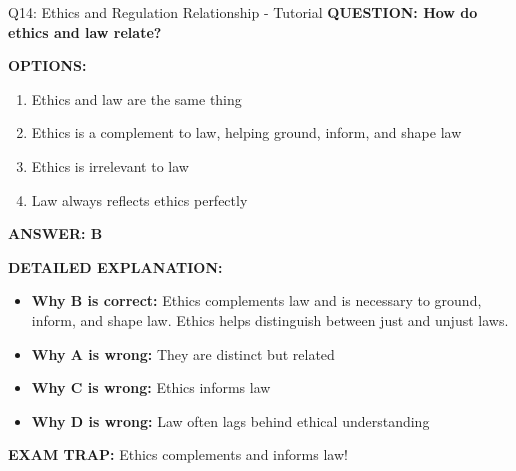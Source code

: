 \documentclass[8pt]{beamer}
\begin{document}
	\begin{frame}{Q14: Ethics and Regulation Relationship - Tutorial}
		\fontsize{6.5}{7.5}\selectfont
		\textbf{QUESTION: How do ethics and law relate?}
		
		\vspace{0.1cm}
		\textbf{OPTIONS:}
		\begin{enumerate}
			\item Ethics and law are the same thing
			\item Ethics is a complement to law, helping ground, inform, and shape law
			\item Ethics is irrelevant to law
			\item Law always reflects ethics perfectly
		\end{enumerate}
		
		\vspace{0.1cm}
		\textcolor{myblue}{\textbf{ANSWER: B}}
		
		\vspace{0.1cm}
		\textbf{DETAILED EXPLANATION:}
		\begin{itemize}
			\item \textbf{Why B is correct:} Ethics complements law and is necessary to ground, inform, and shape law. Ethics helps distinguish between just and unjust laws.
			\item \textbf{Why A is wrong:} They are distinct but related
			\item \textbf{Why C is wrong:} Ethics informs law
			\item \textbf{Why D is wrong:} Law often lags behind ethical understanding
		\end{itemize}
		
		\textcolor{myred}{\textbf{EXAM TRAP:}} Ethics \textcolor{myblue}{complements and informs} law!
	\end{frame}
	
\end{document}
